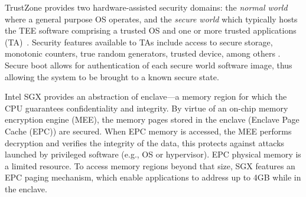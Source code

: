 TrustZone provides two hardware-assisted security domains: the \textit{normal world} where a general purpose OS operates, and the \textit{secure world} which typically hosts the TEE software comprising a trusted OS and one or more trusted applications (TA)~\cite{armtz}. 
Security features available to TAs include access to secure storage, monotonic counters, true random generators, trusted device, among others \cite{tee-gp}.
Secure boot allows for authentication of each secure world software image, thus allowing the system to be brought to a known secure state. 

Intel SGX provides an abstraction of enclave---a memory region for which
the CPU guarantees confidentiality and integrity. By virtue of an on-chip memory
encryption engine (MEE), the memory pages stored in the enclave (Enclave Page Cache (EPC)) are secured. When EPC memory is accessed, the MEE performs decryption and verifies the integrity of the data, this protects against attacks launched
by privileged software (e.g., OS or hypervisor). EPC physical memory is a limited resource. To access memory regions beyond that size, SGX features an EPC paging mechanism, which enable applications to address up to 4GB while in the enclave.


